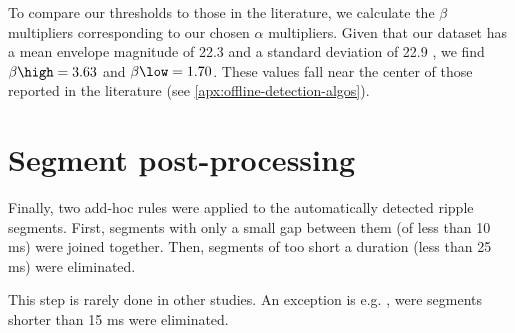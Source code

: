
To compare our thresholds to those in the literature, we calculate the $\beta$ multipliers corresponding to our chosen $\alpha$ multipliers. Given that our dataset has a mean envelope magnitude of 22.3 \uV{} and a standard deviation of 22.9 \uV{}, we find $\beta\high = 3.63$ and $\beta\low = 1.70$. These values fall near the center of those reported in the literature (see \cref{apx:offline-detection-algos}).



\section{Segment post-processing}

Finally, two add-hoc rules were applied to the automatically detected ripple segments. First, segments with only a small gap between them (of less than 10 ms) were joined together. Then, segments of too short a duration (less than 25 ms) were eliminated.

This step is rarely done in other studies. An exception is e.g. \cite{Dutta2018}, were segments shorter than 15 ms were eliminated.



